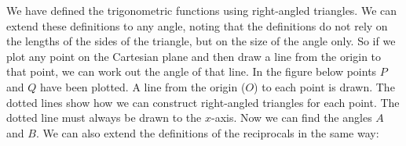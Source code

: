 We have defined the trigonometric functions using right-angled
triangles. We can extend these definitions to any angle, noting that
the definitions do not rely on the lengths of the sides of the
triangle, but on the size of the angle only. So if we plot any point
on the Cartesian plane and then draw a line from the origin to that
point, we can work out the angle of that line. In the figure below
points $P$ and $Q$ have been plotted. A line from the origin ($O$) to
each point is drawn. The dotted lines show how we can construct
right-angled triangles for each point. The dotted line must always be
drawn to the $x$-axis. Now we can find the angles $A$ and $B$. We can
also extend the definitions of the reciprocals in the same way:


\setcounter{subfigure}{0}
\begin{center}


\end{center}
